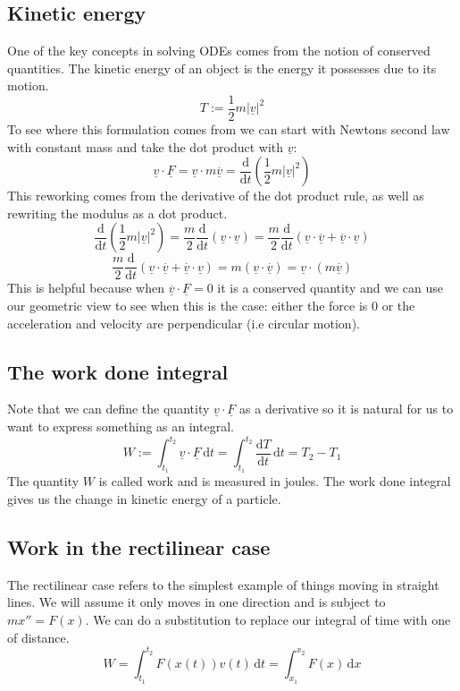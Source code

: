 \documentclass[12pt]{article}
\newcommand{\df}[2]{\frac{\text{d}#1}{\text{d}#2}}
\begin{document}
\subsection*{Kinetic energy}
One of the key concepts in solving ODEs comes from the notion of conserved quantities. The kinetic energy of an object is the energy it possesses due to its motion.
\[T:=\frac{1}{2}m|\underline{v}|^2\]
To see where this formulation comes from we can start with Newtons second law with constant mass and take the dot product with \(\underline{v}\):
\[\underline{v}\cdot\underline{F}=\underline{v}\cdot m\overset{.}{\underline{v}}=\df{}{t}\left(\frac{1}{2}m|\underline{v}|^2\right)\]
This reworking comes from the derivative of the dot product rule, as well as rewriting the modulus as a dot product.
\[\df{}{t}\left(\frac{1}{2}m|\underline{v}|^2\right)=\frac{m}{2}\df{}{t}\left(\underline{v}\cdot\underline{v}\right)=\frac{m}{2}\df{}{t}\left(\underline{v}\cdot\overset{.}{\underline{v}}+\overset{.}{\underline{v}}\cdot\underline{v}\right)\]
\[\frac{m}{2}\df{}{t}\left(\underline{v}\cdot\overset{.}{\underline{v}}+\overset{.}{\underline{v}}\cdot\underline{v}\right)=m(\underline{v}\cdot\overset{.}{\underline{v}})=\underline{v}\cdot(m\overset{.}{\underline{v}})\]
This is helpful because when \(\overset{.}{\underline{v}}\cdot\underline{F}=0\) it is a conserved quantity and we can use our geometric view to see when this is the case: either the force is 0 or the acceleration and velocity are perpendicular (i.e circular motion).
\subsection*{The work done integral}
Note that we can define the quantity \(\underline{v}\cdot\underline{F}\) as a derivative so it is natural for us to want to express something as an integral.
\[W:=\int_{t_1}^{t_2}\underline{v}\cdot\underline{F}\,\text{d}t=\int_{t_1}^{t_2}\df{T}{t}\,\text{d}t=T_2-T_1\]
The quantity \(W\) is called work and is measured in joules. The work done integral gives us the change in kinetic energy of a particle.
\subsection*{Work in the rectilinear case}
The rectilinear case refers to the simplest  example of things moving in straight lines. We will assume it only moves in one direction and is subject to \(mx''=F(x)\). We can do a substitution to replace our integral of time with one of distance.
\[W=\int_{t_1}^{t_2}F(x(t))v(t)\,\text{d}t=\int_{x_1}^{x_2}F(x)\,\text{d}x\]
\end{document}
